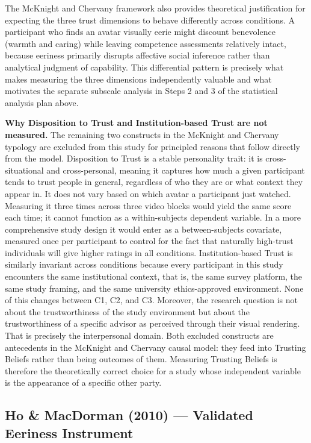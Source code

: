 \documentclass[11pt, a4paper]{article}
\begin{document}
The McKnight and Chervany framework also provides theoretical justification for expecting the three trust dimensions to behave differently across conditions. A participant who finds an avatar visually eerie might discount benevolence (warmth and caring) while leaving competence assessments relatively intact, because eeriness primarily disrupts affective social inference rather than analytical judgment of capability. This differential pattern is precisely what makes measuring the three dimensions independently valuable and what motivates the separate subscale analysis in Steps 2 and 3 of the statistical analysis plan above.

\medskip
\noindent\textbf{Why Disposition to Trust and Institution-based Trust are not measured.} The remaining two constructs in the McKnight and Chervany typology are excluded from this study for principled reasons that follow directly from the model. Disposition to Trust is a stable personality trait: it is cross-situational and cross-personal, meaning it captures how much a given participant tends to trust people in general, regardless of who they are or what context they appear in. It does not vary based on which avatar a participant just watched. Measuring it three times across three video blocks would yield the same score each time; it cannot function as a within-subjects dependent variable. In a more comprehensive study design it would enter as a between-subjects covariate, measured once per participant to control for the fact that naturally high-trust individuals will give higher ratings in all conditions. Institution-based Trust is similarly invariant across conditions because every participant in this study encounters the same institutional context, that is, the same survey platform, the same study framing, and the same university ethics-approved environment. None of this changes between C1, C2, and C3. Moreover, the research question is not about the trustworthiness of the study environment but about the trustworthiness of a specific advisor as perceived through their visual rendering. That is precisely the interpersonal domain. Both excluded constructs are antecedents in the McKnight and Chervany causal model: they feed into Trusting Beliefs rather than being outcomes of them. Measuring Trusting Beliefs is therefore the theoretically correct choice for a study whose independent variable is the appearance of a specific other party.

\subsection{Ho \& MacDorman (2010) --- Validated Eeriness Instrument}
\end{document}
